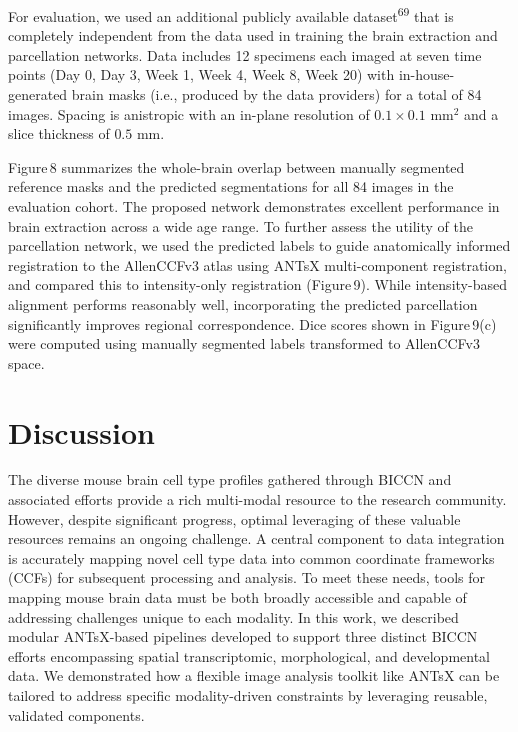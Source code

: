 \documentclass[
  12pt,
]{article}
\begin{document}
For evaluation, we used an additional publicly available
dataset\textsuperscript{69} that is completely independent from the data
used in training the brain extraction and parcellation networks. Data
includes 12 specimens each imaged at seven time points (Day 0, Day 3,
Week 1, Week 4, Week 8, Week 20) with in-house-generated brain masks
(i.e., produced by the data providers) for a total of 84 images. Spacing
is anistropic with an in-plane resolution of \(0.1
\times 0.1\) mm\(^2\) and a slice thickness of \(0.5\) mm.

Figure\,8 summarizes the whole-brain overlap between manually segmented
reference masks and the predicted segmentations for all 84 images in the
evaluation cohort. The proposed network demonstrates excellent
performance in brain extraction across a wide age range. To further
assess the utility of the parcellation network, we used the predicted
labels to guide anatomically informed registration to the AllenCCFv3
atlas using ANTsX multi-component registration, and compared this to
intensity-only registration (Figure\,9). While intensity-based alignment
performs reasonably well, incorporating the predicted parcellation
significantly improves regional correspondence. Dice scores shown in
Figure\,9(c) were computed using manually segmented labels transformed
to AllenCCFv3 space. \clearpage \newpage

\section{Discussion}\label{discussion}

The diverse mouse brain cell type profiles gathered through BICCN and
associated efforts provide a rich multi-modal resource to the research
community. However, despite significant progress, optimal leveraging of
these valuable resources remains an ongoing challenge. A central
component to data integration is accurately mapping novel cell type data
into common coordinate frameworks (CCFs) for subsequent processing and
analysis. To meet these needs, tools for mapping mouse brain data must
be both broadly accessible and capable of addressing challenges unique
to each modality. In this work, we described modular ANTsX-based
pipelines developed to support three distinct BICCN efforts encompassing
spatial transcriptomic, morphological, and developmental data. We
demonstrated how a flexible image analysis toolkit like ANTsX can be
tailored to address specific modality-driven constraints by leveraging
reusable, validated components.
\end{document}

